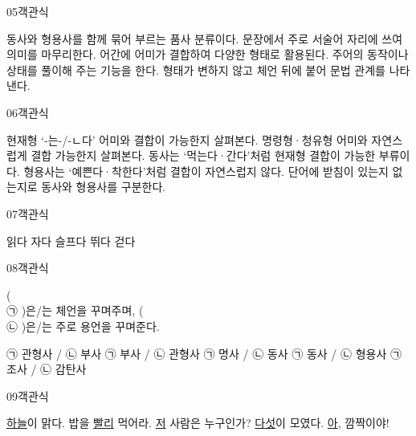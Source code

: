 \documentclass[fs9,seriesRus]{korfarm-base}
\begin{document}
\begin{kfQBlock}{05}{객관식}
\begin{kfChoices}
\kfChoice 동사와 형용사를 함께 묶어 부르는 품사 분류이다.
\kfChoice 문장에서 주로 서술어 자리에 쓰여 의미를 마무리한다.
\kfChoice 어간에 어미가 결합하여 다양한 형태로 활용된다.
\kfChoice 주어의 동작이나 상태를 풀이해 주는 기능을 한다.
\kfChoice 형태가 변하지 않고 체언 뒤에 붙어 문법 관계를 나타낸다.
\end{kfChoices}
\end{kfQBlock}
\begin{kfQBlock}{06}{객관식}
\begin{kfChoices}
\kfChoice 현재형 ‘-는-/-ㄴ다’ 어미와 결합이 가능한지 살펴본다.
\kfChoice 명령형·청유형 어미와 자연스럽게 결합 가능한지 살펴본다.
\kfChoice 동사는 ‘먹는다·간다’처럼 현재형 결합이 가능한 부류이다.
\kfChoice 형용사는 ‘예쁜다·착한다’처럼 결합이 자연스럽지 않다.
\kfChoice 단어에 받침이 있는지 없는지로 동사와 형용사를 구분한다.
\end{kfChoices}
\end{kfQBlock}
\begin{kfQBlock}{07}{객관식}
\begin{kfChoices}
\kfChoice 읽다
\kfChoice 자다
\kfChoice 슬프다
\kfChoice 뛰다
\kfChoice 걷다
\end{kfChoices}
\end{kfQBlock}
\begin{kfQBlock}{08}{객관식}
\begin{kfEvidence}( \\\relax
㉠ )은/는 체언을 꾸며주며, ( \\\relax
㉡ )은/는 주로 용언을 꾸며준다.\end{kfEvidence}
\begin{kfChoices}
\kfChoice ㉠ 관형사 / ㉡ 부사
\kfChoice ㉠ 부사 / ㉡ 관형사
\kfChoice ㉠ 명사 / ㉡ 동사
\kfChoice ㉠ 동사 / ㉡ 형용사
\kfChoice ㉠ 조사 / ㉡ 감탄사
\end{kfChoices}
\end{kfQBlock}
\begin{kfQBlock}{09}{객관식}
\begin{kfChoices}
\kfChoice \uline{하늘}이 맑다.
\kfChoice 밥을 \uline{빨리} 먹어라.
\kfChoice \uline{저} 사람은 누구인가?
\kfChoice \uline{다섯}이 모였다.
\kfChoice \uline{아}, 깜짝이야!
\end{kfChoices}
\end{kfQBlock}
\end{document}
